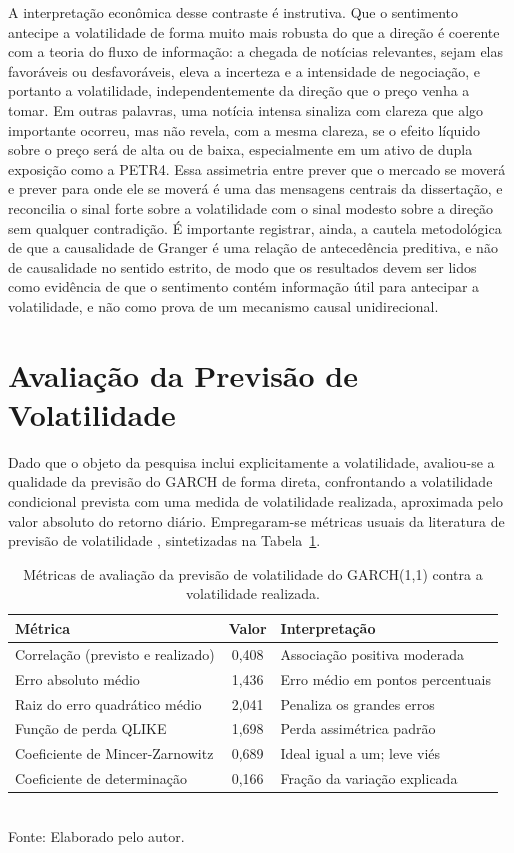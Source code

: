 A interpretação econômica desse contraste é instrutiva. Que o sentimento antecipe a volatilidade de forma muito mais robusta do que a direção é coerente com a teoria do fluxo de informação: a chegada de notícias relevantes, sejam elas favoráveis ou desfavoráveis, eleva a incerteza e a intensidade de negociação, e portanto a volatilidade, independentemente da direção que o preço venha a tomar. Em outras palavras, uma notícia intensa sinaliza com clareza que algo importante ocorreu, mas não revela, com a mesma clareza, se o efeito líquido sobre o preço será de alta ou de baixa, especialmente em um ativo de dupla exposição como a PETR4. Essa assimetria entre prever que o mercado se moverá e prever para onde ele se moverá é uma das mensagens centrais da dissertação, e reconcilia o sinal forte sobre a volatilidade com o sinal modesto sobre a direção sem qualquer contradição. É importante registrar, ainda, a cautela metodológica de que a causalidade de Granger é uma relação de antecedência preditiva, e não de causalidade no sentido estrito, de modo que os resultados devem ser lidos como evidência de que o sentimento contém informação útil para antecipar a volatilidade, e não como prova de um mecanismo causal unidirecional.

\section{Avaliação da Previsão de Volatilidade}

Dado que o objeto da pesquisa inclui explicitamente a volatilidade, avaliou-se a qualidade da previsão do GARCH de forma direta, confrontando a volatilidade condicional prevista com uma medida de volatilidade realizada, aproximada pelo valor absoluto do retorno diário. Empregaram-se métricas usuais da literatura de previsão de volatilidade \cite{patton_volatility_2011, mincer_evaluation_1969}, sintetizadas na Tabela~\ref{tab:volatilidade}.

\begin{table}[htpb]
\centering
\caption{Métricas de avaliação da previsão de volatilidade do GARCH(1,1) contra a volatilidade realizada.}
\label{tab:volatilidade}
\begin{tabular}{lcl}
\hline
\textbf{Métrica} & \textbf{Valor} & \textbf{Interpretação} \\ \hline
Correlação (previsto e realizado) & 0,408 & Associação positiva moderada \\
Erro absoluto médio & 1,436 & Erro médio em pontos percentuais \\
Raiz do erro quadrático médio & 2,041 & Penaliza os grandes erros \\
Função de perda QLIKE & 1,698 & Perda assimétrica padrão \\
Coeficiente de Mincer-Zarnowitz & 0,689 & Ideal igual a um; leve viés \\
Coeficiente de determinação & 0,166 & Fração da variação explicada \\ \hline
\end{tabular}
\vspace{0.2cm}
{\small \\ Fonte: Elaborado pelo autor.}
\end{table}

